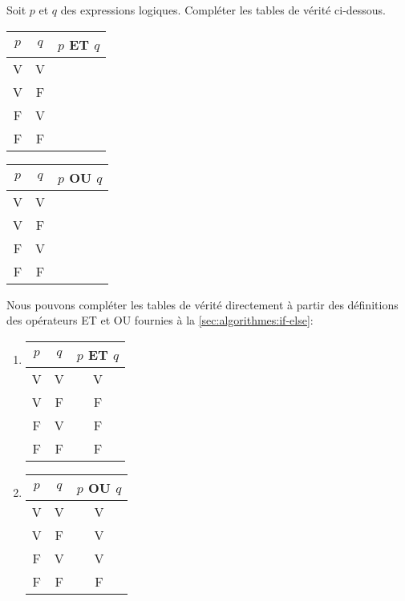 \begin{exercice}
  Soit $p$ et $q$ des expressions logiques. Compléter les tables de
  vérité ci-dessous.
  \begin{enumerate}
    \begin{multicols}{2}
    \item
      \begin{tabular}{ccc}
        \toprule
        $p$ & $q$ & $p$ ET $q$ \\
        \midrule
        V & V \\
        V & F \\
        F & V \\
        F & F \\
        \bottomrule
      \end{tabular}
      \columnbreak
    \item
      \begin{tabular}{ccc}
        \toprule
        $p$ & $q$ & $p$ OU $q$ \\
        \midrule
        V & V \\
        V & F \\
        F & V \\
        F & F \\
        \bottomrule
      \end{tabular}
    \end{multicols}
  \end{enumerate}
  \begin{sol}
    Nous pouvons compléter les tables de vérité directement à partir
    des définitions des opérateurs ET et OU fournies à la
    \autoref{sec:algorithmes:if-else}:
    \begin{multicols}{2}
      \begin{enumerate}
      \item
        \begin{tabular}{ccc}
          \toprule
          $p$ & $q$ & $p$ ET $q$ \\
          \midrule
          V & V & V \\
          V & F & F \\
          F & V & F \\
          F & F & F \\
          \bottomrule
        \end{tabular}
        \columnbreak
      \item
        \begin{tabular}{ccc}
          \toprule
          $p$ & $q$ & $p$ OU $q$ \\
          \midrule
          V & V & V \\
          V & F & V \\
          F & V & V \\
          F & F & F \\
          \bottomrule
        \end{tabular}
      \end{enumerate}
    \end{multicols}
  \end{sol}
\end{exercice}

